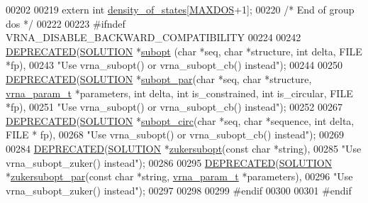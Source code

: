 \begin{DoxyCode}
00202 
00219 \textcolor{keyword}{extern}  \textcolor{keywordtype}{int}     \mbox{\hyperlink{group__dos_ga937634a76b46a22530a74906f1957a9e}{density\_of\_states}}[\mbox{\hyperlink{subopt_8h_a5ec740b80afb4906ba4311dbd8ddbd89}{MAXDOS}}+1];
00220  \textcolor{comment}{/* End of group dos */}
00222 
00223 \textcolor{preprocessor}{#ifndef VRNA\_DISABLE\_BACKWARD\_COMPATIBILITY}
00224 
00242 \mbox{\hyperlink{subopt_8h_aab347a3c03fbe8e7319551b9fa0cce4a}{DEPRECATED}}(\mbox{\hyperlink{structvrna__subopt__sol__s}{SOLUTION}} *\mbox{\hyperlink{group__subopt__wuchty_ga700f662506a233e42dd7fda74fafd40e}{subopt}} (\textcolor{keywordtype}{char} *seq, \textcolor{keywordtype}{char} *structure, \textcolor{keywordtype}{int} delta, FILE *fp),
00243 \textcolor{stringliteral}{"Use vrna\_subopt() or vrna\_subopt\_cb() instead"});
00244 
00250 \mbox{\hyperlink{subopt_8h_aab347a3c03fbe8e7319551b9fa0cce4a}{DEPRECATED}}(\mbox{\hyperlink{structvrna__subopt__sol__s}{SOLUTION}} *\mbox{\hyperlink{group__subopt__wuchty_gaa1e1e7031a948ebcb39a9d58d1e9842c}{subopt\_par}}(\textcolor{keywordtype}{char} *seq, \textcolor{keywordtype}{char} *structure, 
      \mbox{\hyperlink{group__energy__parameters_structvrna__param__s}{vrna\_param\_t}} *parameters, \textcolor{keywordtype}{int} delta, \textcolor{keywordtype}{int} is\_constrained, \textcolor{keywordtype}{int} is\_circular, FILE *fp),
00251 \textcolor{stringliteral}{"Use vrna\_subopt() or vrna\_subopt\_cb() instead"});
00252 
00267 \mbox{\hyperlink{subopt_8h_aab347a3c03fbe8e7319551b9fa0cce4a}{DEPRECATED}}(\mbox{\hyperlink{structvrna__subopt__sol__s}{SOLUTION}} *\mbox{\hyperlink{group__subopt__wuchty_ga8634516e4740e0b6c9a46d2bae940340}{subopt\_circ}}(\textcolor{keywordtype}{char} *seq, \textcolor{keywordtype}{char} *sequence, \textcolor{keywordtype}{int} delta, FILE *
      fp),
00268 \textcolor{stringliteral}{"Use vrna\_subopt() or vrna\_subopt\_cb() instead"});
00269 
00284 \mbox{\hyperlink{subopt_8h_aab347a3c03fbe8e7319551b9fa0cce4a}{DEPRECATED}}(\mbox{\hyperlink{structvrna__subopt__sol__s}{SOLUTION}}  *\mbox{\hyperlink{group__subopt__zuker_ga0d5104e3ecf119d8eabd40aa5fe47f90}{zukersubopt}}(\textcolor{keyword}{const} \textcolor{keywordtype}{char} *\textcolor{keywordtype}{string}),
00285 \textcolor{stringliteral}{"Use vrna\_subopt\_zuker() instead"});
00286 
00295 \mbox{\hyperlink{subopt_8h_aab347a3c03fbe8e7319551b9fa0cce4a}{DEPRECATED}}(\mbox{\hyperlink{structvrna__subopt__sol__s}{SOLUTION}}  *\mbox{\hyperlink{group__subopt__zuker_gab6d0ea8cc1d02f6dd831ca81043c9eb8}{zukersubopt\_par}}(\textcolor{keyword}{const} \textcolor{keywordtype}{char} *\textcolor{keywordtype}{string}, 
      \mbox{\hyperlink{group__energy__parameters_structvrna__param__s}{vrna\_param\_t}} *parameters),
00296 \textcolor{stringliteral}{"Use vrna\_subopt\_zuker() instead"});
00297 
00298 
00299 \textcolor{preprocessor}{#endif}
00300 
00301 \textcolor{preprocessor}{#endif}
\end{DoxyCode}
